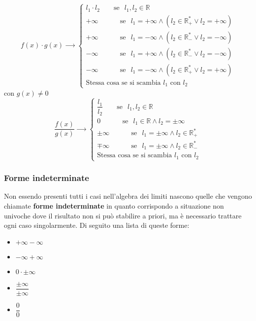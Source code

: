 \begin{equation*}
    f(x) \cdot g(x) \xrightarrow{\qquad}
    \begin{cases*}
        l_1 \cdot l_2 \qquad \text{se}\;\;\, l_1,l_2 \in \mathbb{R}\\
        +\infty \quad\, \qquad \text{se}\;\;\, l_1 = +\infty \land (l_2 \in \mathbb{R}_+^* \lor l_2 = +\infty)\\
        +\infty \quad\, \qquad \text{se}\;\;\, l_1 = -\infty \land (l_2 \in \mathbb{R}_-^* \lor l_2 = -\infty)\\
        -\infty \quad\, \qquad \text{se}\;\;\, l_1 = +\infty \land (l_2 \in \mathbb{R}_-^* \lor l_2 =-\infty)\\
        -\infty \quad\, \qquad \text{se}\;\;\, l_1 = -\infty \land (l_2 \in \mathbb{R}_+^* \lor l_2 = +\infty)\\
        \text{Stessa cosa se si scambia $l_1$ con $l_2$}
    \end{cases*}
\end{equation*}
con $g(x) \neq 0$
\begin{equation*}
    \dfrac{f(x)}{g(x)} \xrightarrow{\qquad}
    \begin{cases*}
        \dfrac{l_1}{l_2} \qquad \text{se}\;\;\, l_1,l_2 \in \mathbb{R}\\
        0 \quad\, \qquad \text{se}\;\;\, l_1 \in \mathbb{R} \land l_2 = \pm \infty\\
        \pm \infty \quad\, \qquad \text{se}\;\;\, l_1 = \pm \infty \land l_2 \in \mathbb{R}_+^*\\
        \mp \infty \quad\, \qquad \text{se}\;\;\, l_1 = \pm \infty \land l_2 \in \mathbb{R}_-^*\\
        \text{Stessa cosa se si scambia $l_1$ con $l_2$}
    \end{cases*}
\end{equation*}

\subsubsection{Forme indeterminate}
Non essendo presenti tutti i casi nell'algebra dei limiti nascono quelle che vengono chiamate \textbf{forme indeterminate} in quanto corrispondo a situazione non univoche dove il risultato non si può stabilire a priori, ma è necessario trattare ogni caso singolarmente. Di seguito una lista di queste forme:
\begin{itemize}
    \item $+\infty - \infty$
    \item $-\infty + \infty$
    \item $0 \cdot \pm \infty $
    \item $\dfrac{\pm \infty}{\pm \infty}$
    \item $\dfrac{0}{0}$
\end{itemize}

